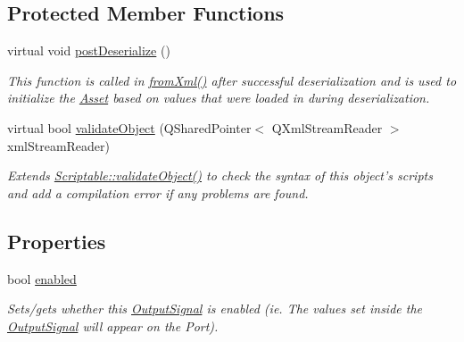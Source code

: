 \subsection*{Protected Member Functions}
\begin{DoxyCompactItemize}
\item 
virtual void \hyperlink{struct_picto_1_1_output_signal_af6516d590c0adf04a169d15cce762368}{post\-Deserialize} ()
\begin{DoxyCompactList}\small\item\em This function is called in \hyperlink{class_picto_1_1_asset_a8bed4da09ecb1c07ce0dab313a9aba67}{from\-Xml()} after successful deserialization and is used to initialize the \hyperlink{class_picto_1_1_asset}{Asset} based on values that were loaded in during deserialization. \end{DoxyCompactList}\item 
\hypertarget{struct_picto_1_1_output_signal_a5401d53b65a3664df866aef4455d42fe}{virtual bool \hyperlink{struct_picto_1_1_output_signal_a5401d53b65a3664df866aef4455d42fe}{validate\-Object} (Q\-Shared\-Pointer$<$ Q\-Xml\-Stream\-Reader $>$ xml\-Stream\-Reader)}\label{struct_picto_1_1_output_signal_a5401d53b65a3664df866aef4455d42fe}

\begin{DoxyCompactList}\small\item\em Extends \hyperlink{class_picto_1_1_scriptable_ab6e2944c43a3b5d418bf7b251594386d}{Scriptable\-::validate\-Object()} to check the syntax of this object's scripts and add a compilation error if any problems are found. \end{DoxyCompactList}\end{DoxyCompactItemize}
\subsection*{Properties}
\begin{DoxyCompactItemize}
\item 
\hypertarget{struct_picto_1_1_output_signal_a9ce6698871455bc355d2fab0efa8e317}{bool \hyperlink{struct_picto_1_1_output_signal_a9ce6698871455bc355d2fab0efa8e317}{enabled}}\label{struct_picto_1_1_output_signal_a9ce6698871455bc355d2fab0efa8e317}

\begin{DoxyCompactList}\small\item\em Sets/gets whether this \hyperlink{struct_picto_1_1_output_signal}{Output\-Signal} is enabled (ie. The values set inside the \hyperlink{struct_picto_1_1_output_signal}{Output\-Signal} will appear on the Port). \end{DoxyCompactList}\end{DoxyCompactItemize}

